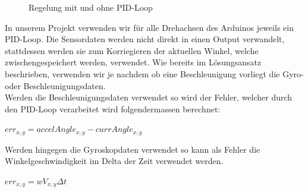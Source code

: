 \begin{figure}[H]
\centering
{}
  \caption{Regelung mit und ohne PID-Loop}
\end{figure}

In unserem Projekt verwenden wir für alle Drehachsen des Arduinos jeweils ein PID-Loop. 
Die Sensordaten werden nicht direkt in einen Output verwandelt, stattdessen werden sie zum Korriegieren der aktuellen Winkel, welche zwischengespeichert werden, verwendet.
Wie bereits im Lösungsansatz beschrieben, verwenden wir je nachdem ob eine Beschleunigung vorliegt die Gyro- oder Beschleunigungsdaten.\\
Werden die Beschleunigungsdaten verwendet so wird der Fehler, welcher durch den PID-Loop verarbeitet wird folgendermassen berechnet:

\vspace{5mm}
\begin{math} err_{x,y} = accelAngle_{x,y} - currAngle_{x,y} \end{math}
\vspace{5mm}

Werden hingegen die Gyroskopdaten verwendet so kann als Fehler die Winkelgeschwindigkeit im Delta der Zeit verwendet werden.

\vspace{5mm}
\begin{math} err_{x,y} = wV_{x,y}\Delta{t}\end{math}
\vspace{5mm}



